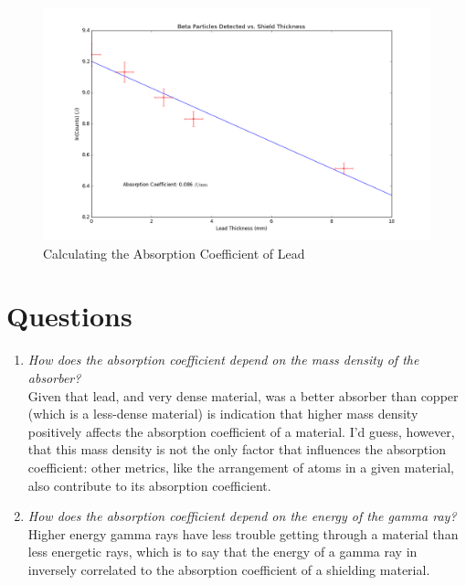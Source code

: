 \documentclass{amsart}
\begin{document}
\begin{figure}[H]
    \centering
    \includegraphics[width=\textwidth]{fitted2.png}
    \caption{Calculating the Absorption Coefficient of Lead}
    \label{lead}
\end{figure}

\section{Questions}

\begin{enumerate}
    \item {\textit{How does the absorption coefficient depend on the mass density of the absorber?}\\
        Given that lead, and very dense material, was a better absorber than copper (which is a less-dense material) is indication that higher mass density positively affects the absorption coefficient of a material. I'd guess, however, that this mass density is not the only factor that influences the absorption coefficient: other metrics, like the arrangement of atoms in a given material, also contribute to its absorption coefficient.
    }
    \item {\textit{How does the absorption coefficient depend on the energy of the gamma ray?}\\
        Higher energy gamma rays have less trouble getting through a material than less energetic rays, which is to say that the energy of a gamma ray in inversely correlated to the absorption coefficient of a shielding material.
    }
\end{enumerate}
\end{document}

